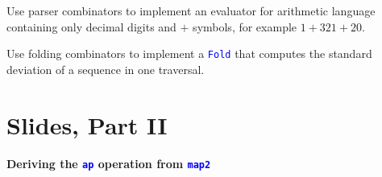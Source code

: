 Use parser combinators to implement an evaluator for arithmetic language
containing only decimal digits and $+$ symbols, for example $1+321+20$.

Use folding combinators to implement a \texttt{\textcolor{blue}{\footnotesize{}Fold}}
that computes the standard deviation of a sequence in one traversal.

\section{Slides, Part II}

\paragraph{Deriving the \texttt{\textcolor{blue}{\footnotesize{}ap}} operation
from \texttt{\textcolor{blue}{\footnotesize{}map2}} }

